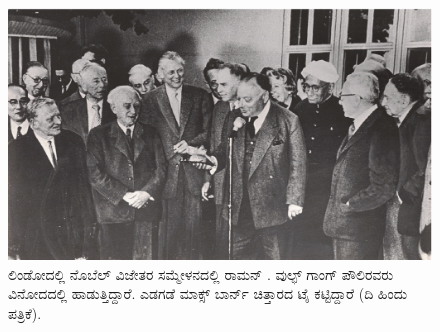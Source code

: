 \begin{figure}[!htbp]
\centering
\includegraphics[scale=0.22]{"images/8.jpg"}
\caption{ಲಿಂಡೋದಲ್ಲಿ ನೊಬೆಲ್ ವಿಜೇತರ ಸಮ್ಮೇಳನದಲ್ಲಿ ರಾಮನ್ . ವುಲ್ಫ್ ಗಾಂಗ್ ಪೌಲಿರವರು ವಿನೋದದಲ್ಲಿ ಹಾಡುತ್ತಿದ್ದಾರೆ. ಎಡಗಡೆ ಮಾಕ್ಸ್ ಬಾರ್ನ್ ಚಿತ್ತಾರದ ಟೈ ಕಟ್ಟಿದ್ದಾರೆ (ದಿ ಹಿಂದು ಪತ್ರಿಕೆ).}\label{chap3-fig05}
\end{figure}

\vfill

